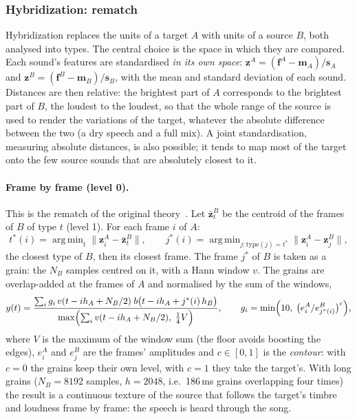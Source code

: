 \documentclass[11pt,a4paper]{article}
\newcommand{\norm}[1]{\lVert #1 \rVert}
\DeclareMathOperator*{\argmin}{arg\,min}
\begin{document}
\subsubsection{Hybridization: rematch}

Hybridization replaces the units of a target $A$ with units of a source
$B$, both analysed into types. The central choice is the space in which they
are compared. Each sound's features are standardised \emph{in its own
space}: $\bm{z}^A = (\bm{f}^A - \bm{m}_A)/\bm{s}_A$ and
$\bm{z}^B = (\bm{f}^B - \bm{m}_B)/\bm{s}_B$, with the mean and standard
deviation of each sound. Distances are then relative: the brightest part of
$A$ corresponds to the brightest part of $B$, the loudest to the loudest, so
that the whole range of the source is used to render the variations of the
target, whatever the absolute difference between the two (a dry speech and
a full mix). A joint standardisation, measuring absolute distances, is also
possible; it tends to map most of the target onto the few source sounds that
are absolutely closest to it.

\paragraph{Frame by frame (level 0).} This is the rematch of the original
theory~\cite{cella2013hybrid}. Let $\bar{\bm{z}}^B_t$ be the centroid of the
frames of $B$ of type $t$ (level 1). For each frame $i$ of $A$:
\begin{equation}
  t^*(i) = \argmin_t \norm{\bm{z}^A_i - \bar{\bm{z}}^B_t}, \qquad
  j^*(i) = \argmin_{j : \mathrm{type}(j) = t^*} \norm{\bm{z}^A_i - \bm{z}^B_j},
\end{equation}
the closest type of $B$, then its closest frame. The frame $j^*$ of $B$ is
taken as a grain: the $N_B$ samples centred on it, with a Hann window $v$.
The grains are overlap-added at the frames of $A$ and normalised by the sum
of the windows,
\begin{equation}
  y(t) = \frac{\sum_i g_i \, v(t - i h_A + N_B/2)\; b\bigl(t - i h_A + j^*(i)\, h_B\bigr)}{\max\Bigl(\sum_i v(t - i h_A + N_B/2),\; \tfrac14 V\Bigr)},
  \qquad
  g_i = \min\Bigl(10,\; \bigl(e^A_i / e^B_{j^*(i)}\bigr)^{c}\Bigr),
\end{equation}
where $V$ is the maximum of the window sum (the floor avoids boosting the
edges), $e^A_i$ and $e^B_j$ are the frames' amplitudes and $c \in [0,1]$ is
the \emph{contour}: with $c = 0$ the grains keep their own level, with
$c = 1$ they take the target's. With long grains ($N_B = 8192$ samples,
$h = 2048$, i.e.\ 186\,ms grains overlapping four times) the result is a
continuous texture of the source that follows the target's timbre and
loudness frame by frame: the speech is heard through the song.
\end{document}

